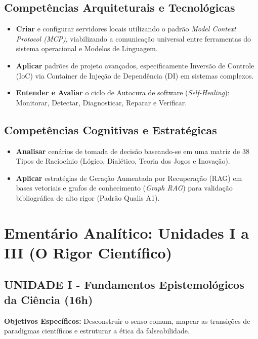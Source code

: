 \documentclass[12pt,a4paper]{article}
\begin{document}
\subsection{Competências Arquiteturais e Tecnológicas}
\begin{itemize}
    \item \textbf{Criar} e configurar servidores locais utilizando o padrão \textit{Model Context Protocol (MCP)}, viabilizando a comunicação universal entre ferramentas do sistema operacional e Modelos de Linguagem.
    \item \textbf{Aplicar} padrões de projeto avançados, especificamente Inversão de Controle (IoC) via Container de Injeção de Dependência (DI) em sistemas complexos.
    \item \textbf{Entender e Avaliar} o ciclo de Autocura de software (\textit{Self-Healing}): Monitorar, Detectar, Diagnosticar, Reparar e Verificar.
\end{itemize}

\subsection{Competências Cognitivas e Estratégicas}
\begin{itemize}
    \item \textbf{Analisar} cenários de tomada de decisão baseando-se em uma matriz de 38 Tipos de Raciocínio (Lógico, Dialético, Teoria dos Jogos e Inovação).
    \item \textbf{Aplicar} estratégias de Geração Aumentada por Recuperação (RAG) em bases vetoriais e grafos de conhecimento (\textit{Graph RAG}) para validação bibliográfica de alto rigor (Padrão Qualis A1).
\end{itemize}

\newpage
\section{Ementário Analítico: Unidades I a III (O Rigor Científico)}

\subsection{UNIDADE I - Fundamentos Epistemológicos da Ciência (16h)}
\textbf{Objetivos Específicos:} Desconstruir o senso comum, mapear as transições de paradigmas científicos e estruturar a ética da falseabilidade.
\end{document}
